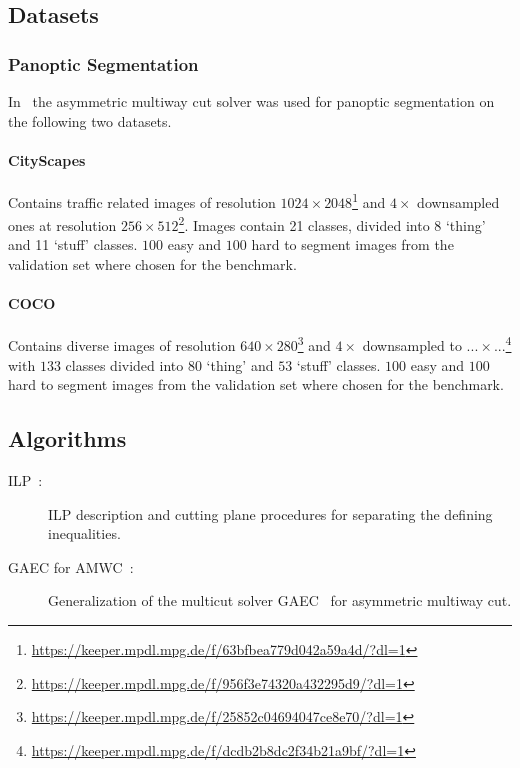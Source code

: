 \subsection{Datasets}

\subsubsection{Panoptic Segmentation}
In~\cite{abbas2021combinatorial} the asymmetric multiway cut solver was used for panoptic segmentation on the following two datasets.

\paragraph{CityScapes}
Contains traffic related images of resolution $1024 \times 2048$\footnote{\url{https://keeper.mpdl.mpg.de/f/63bfbea779d042a59a4d/?dl=1}} and $4 \times$ downsampled ones at resolution $256 \times 512$\footnote{\url{https://keeper.mpdl.mpg.de/f/956f3e74320a432295d9/?dl=1}}.
Images contain 21 classes, divided into 8 `thing' and 11 `stuff' classes.
$100$ easy and $100$ hard to segment images from the validation set where chosen for the benchmark. 

\paragraph{COCO}
Contains diverse images of resolution $640 \times 280$\footnote{\url{https://keeper.mpdl.mpg.de/f/25852c04694047ce8e70/?dl=1}} and $4 \times$ downsampled to $... \times ...$\footnote{\url{https://keeper.mpdl.mpg.de/f/dcdb2b8dc2f34b21a9bf/?dl=1}} with $133$ classes divided into $80$ `thing' and $53$ `stuff' classes.
$100$ easy and $100$ hard to segment images from the validation set where chosen for the benchmark. 

\subsection{Algorithms}
\begin{description}
\item[ILP~\cite{kroeger2014asymmetric}:] ILP description and cutting plane procedures for separating the defining inequalities.
\item[GAEC for AMWC~\cite{abbas2021combinatorial}:] Generalization of the multicut solver GAEC~\cite{keuper2015efficient} for asymmetric multiway cut.
\end{description}
